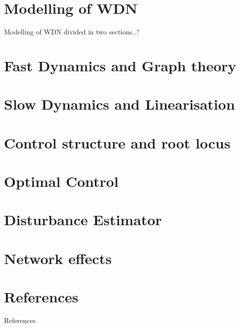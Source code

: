 \documentclass[10pt]{beamer}
\begin{document}

\section{Modelling of WDN}

\begin{frame}{Modelling of WDN}
	divided in two sections..?
\end{frame}
\section{Fast Dynamics and Graph theory}

%
\section{Slow Dynamics and Linearisation}

%
\section{Control structure and root locus}


\section{Optimal Control}


\section{Disturbance Estimator}

%
\section{Network effects}

%
%



















\section{References}
\begin{frame}{References}
	
	
\end{frame}

{\aauwavesbg
\begin{frame}
\end{frame}}
\end{document}

